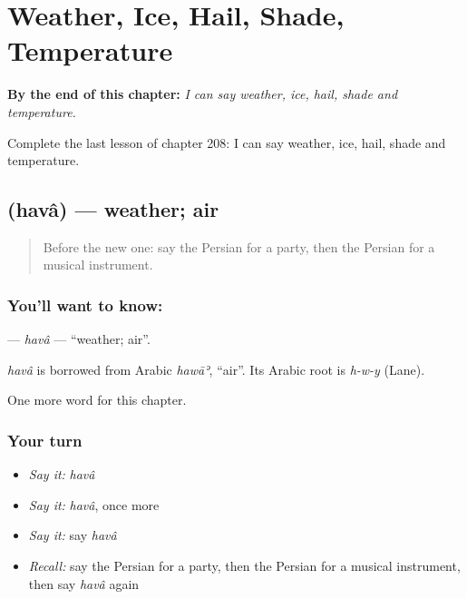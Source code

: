
\chapter{Weather, Ice, Hail, Shade, Temperature}
\label{ch:fa-weather-ice-hail-shade-temperature}

\begin{chapteropening}
\textbf{By the end of this chapter:} \emph{I can say weather, ice, hail, shade and temperature.}

Complete the last lesson of chapter 208: I can say weather, ice, hail, shade and temperature.
\end{chapteropening}

\section[\texorpdfstring{\fa{هوا} (havâ)}{هوا (havâ)}]{ (havâ) — weather; air}

\label{lesson:FA-C208-hava}



\begin{quote}
Before the new one: say the Persian for a party, then the Persian for a musical instrument.
\end{quote}

\subsection*{You'll want to know: }
\textbf{} — \emph{havâ} — \textquotedblleft{}weather; air\textquotedblright{}.

\begin{cousinweb}
\emph{havâ} is borrowed from Arabic \emph{hawāʾ}, \textquotedblleft{}air\textquotedblright{}. Its Arabic root is \emph{h-w-y} (Lane).
\end{cousinweb}

\begin{grammarlens}[title={What you've built}]
One more word for this chapter.
\end{grammarlens}

\subsection*{Your turn}
\begin{itemize}
\raggedright
  \item \emph{Say it:} \emph{havâ}
  \item \emph{Say it:} \emph{havâ}, once more
  \item \emph{Say it:} say \emph{havâ}
  \item \emph{Recall:} say the Persian for a party, then the Persian for a musical instrument, then say \emph{havâ} again
\end{itemize}

